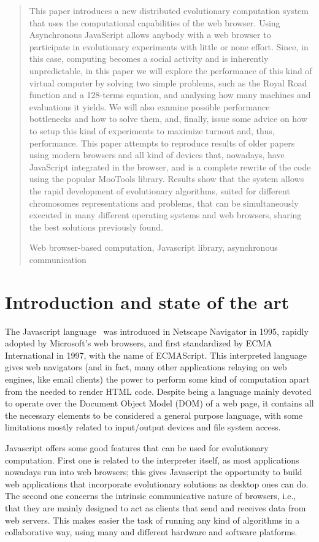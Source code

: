\documentclass[runningheads,a4paper]{llncs}
\newcommand{\keywords}[1]{\par\addvspace\baselineskip
\noindent\keywordname\enspace\ignorespaces#1}
\begin{document}
\begin{abstract}
This paper introduces a new distributed evolutionary computation system that uses the computational capabilities of the web browser. Using Asynchronous JavaScript allows anybody with a web browser
to participate in evolutionary experiments with little or none effort. Since, in
this case, computing becomes a social activity and is inherently unpredictable, in this paper we will explore the performance of this kind of virtual computer by solving two simple problems, such as the Royal Road function and a 128-terms equation, and analysing how many machines and evaluations it yields. We will also examine possible performance bottlenecks
and how to solve them, and, finally, issue some advice on how to setup
this kind of experiments to maximize turnout and, thus, performance.
This paper attempts to reproduce results of older papers using modern
browsers and all kind of devices that, nowadays, have JavaScript integrated in the browser, and is a complete rewrite of the code using the popular MooTools library. 
Results show that the system allows the rapid development of evolutionary algorithms, suited for different chromosomes representations and problems, that can be simultaneously executed in many different operating systems and web browsers, sharing the best solutions previously found.
\keywords{Web browser-based computation, Javascript library, asynchronous communication}
\end{abstract}


\section{Introduction and state of the art}
\label{sec:intro}
The Javascript language~\cite{javascript} was introduced in Netscape Navigator in 1995, rapidly adopted by Microsoft's web browsers, and first standardized  by ECMA International in 1997, with the name of ECMAScript. This interpreted language gives web navigators (and in fact, many other applications relaying on web engines, like email clients) the power to perform some kind of computation apart from the needed to render HTML code. Despite being a language mainly devoted to operate over the Document Object Model (DOM) of a web page, it contains all the necessary elements to be considered a general purpose language, with some limitations mostly related to input/output devices and file system access.

Javascript offers some good features that can be used for evolutionary computation. First one is related to the interpreter itself, as most applications nowadays run into web browsers; this gives Javascript the opportunity to build web applications that incorporate evolutionary solutions as desktop ones can do. The second one concerns the intrinsic communicative nature of browsers, i.e., that they are mainly designed to act as clients that send and receives data from web servers. This makes easier the task of running any kind of algorithms in a collaborative way, using many and different hardware and software platforms. 
\end{document}
